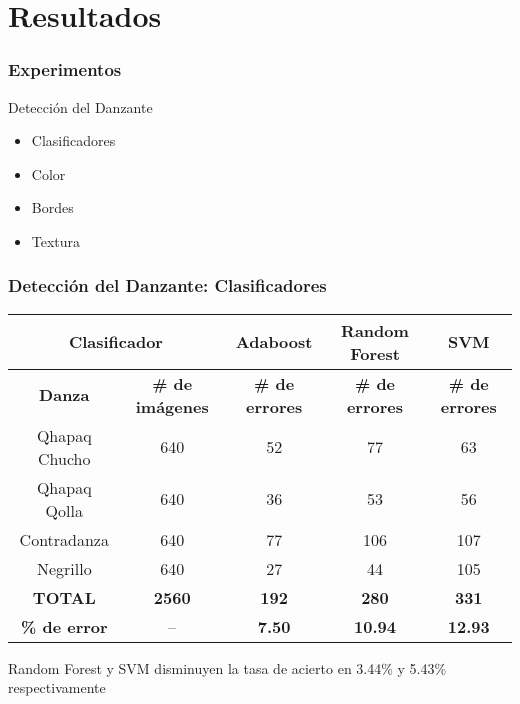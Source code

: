 \section{Resultados}

\begin{frame}
   \frametitle{Experimentos}
   \begin{block}{Detección del Danzante}
      \begin{itemize}
         \item Clasificadores
         \item Color
         \item Bordes
         \item Textura
      \end{itemize}
   \end{block}

\end{frame}

\begin{frame}
   \frametitle{Detección del Danzante: Clasificadores}
   
   \begin{table}[H]
   \centering
   \footnotesize {
   \begin{tabular}{*2c | *3c}
   \toprule
   \multicolumn{2}{c}{\textbf{Clasificador}} & \textbf{Adaboost} & \textbf{Random Forest} & \textbf{SVM} \tabularnewline 
    \midrule
   \textbf{Danza} & \textbf{\# de imágenes} & \textbf{\# de errores}  & \textbf{\# de errores} & \textbf{\# de errores} \tabularnewline 
   \midrule
    Qhapaq Chucho  & 640 & 52 & 77  & 63  \tabularnewline
    Qhapaq Qolla   & 640 & 36 & 53  & 56  \tabularnewline
    Contradanza    & 640 & 77 & 106 & 107 \tabularnewline
    Negrillo       & 640 & 27 & 44  & 105 \tabularnewline
   \midrule
   \textbf{TOTAL}       & \textbf{2560} & \textbf{192} & \textbf{280} & \textbf{331}\tabularnewline 
   \textbf{\% de error} &     --        & \textbf{7.50} & \textbf{10.94} & \textbf{12.93}\tabularnewline
   \bottomrule

   \end{tabular}
   }
   \end{table}
   Random Forest y SVM disminuyen la tasa de acierto en 3.44\% y 5.43\% respectivamente
\end{frame}

